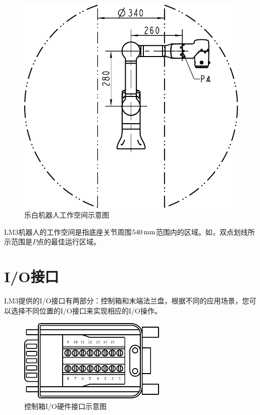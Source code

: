 \begin{figure}[htb!]
{\begin{minipage}[b]{0.4\textwidth}
   		 	\includegraphics[width=\linewidth]{line_graphs/view-via-xy.pdf}
    	\end{minipage}
    }
    \caption{乐白机器人工作空间示意图}
    \label{fig:机器人运动范围}
\end{figure}

LM3机器人的工作空间是指底座关节周围$540\,\mathrm{mm}$范围内的区域。如，双点划线所示范围是$\!P\!$点的最佳运行区域。

\clearpage

\section{I/O接口}

LM3提供的I/O接口有两部分：控制箱和末端法兰盘，根据不同的应用场景，您可以选择不同位置的I/O接口来实现相应的I/O操作。


\begin{figure}[htb!]
    \centering
    \includegraphics[height=4cm]{line_graphs/robot_box_io_plugin.pdf}
    \caption{控制箱I/O硬件接口示意图}
    \label{fig:控制箱IO}
\end{figure}

